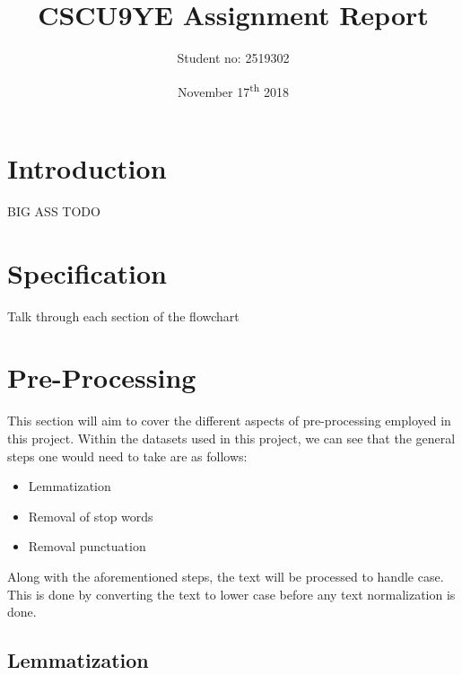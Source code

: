 \documentclass[11pt, a4paper]{article}
\title{CSCU9YE Assignment Report}
\author{Student no: 2519302}
\date{November 17\textsuperscript{th} 2018}
\begin{document}
\begin{titlepage}
\maketitle
\clearpage\thispagestyle{empty}
\end{titlepage}
\doublespacing
{}
\tableofcontents
\thispagestyle{empty}
\newpage
\singlespacing

\section{Introduction}

BIG ASS TODO

\section{Specification}

Talk through each section of the flowchart

\section{Pre-Processing}

This section will aim to cover the different aspects of pre-processing employed in this project. Within the datasets used in this project, we can see that the general steps one would need to take are as follows:
\begin{itemize}
\item Lemmatization
\item Removal of stop words
\item Removal punctuation
\end{itemize} 
Along with the aforementioned steps, the text will be processed to handle case. This is done by converting the text to lower case before any text normalization is done. 

\subsection{Lemmatization}
\end{document}
